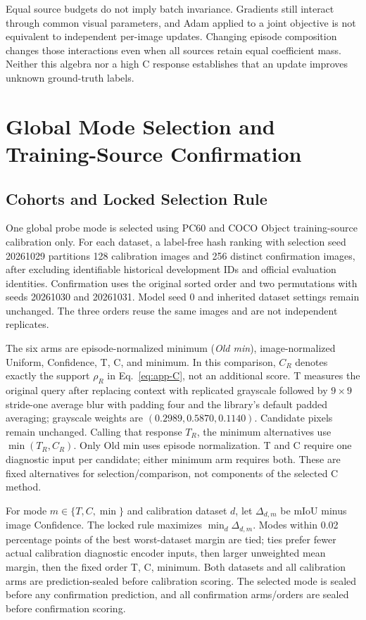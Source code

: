 Equal source budgets do not imply batch invariance. Gradients still interact through common visual parameters, and Adam applied to a joint objective is not equivalent to independent per-image updates. Changing episode composition changes those interactions even when all sources retain equal coefficient mass. Neither this algebra nor a high C response establishes that an update improves unknown ground-truth labels.

\section{Global Mode Selection and Training-Source Confirmation}
\label{app:selection}
\subsection{Cohorts and Locked Selection Rule}
One global probe mode is selected using PC60 and COCO Object training-source calibration only. For each dataset, a label-free hash ranking with selection seed 20261029 partitions 128 calibration images and 256 distinct confirmation images, after excluding identifiable historical development IDs and official evaluation identities. Confirmation uses the original sorted order and two permutations with seeds 20261030 and 20261031. Model seed 0 and inherited dataset settings remain unchanged. The three orders reuse the same images and are not independent replicates.

The six arms are episode-normalized minimum (\emph{Old min}), image-normalized Uniform, Confidence, T, C, and minimum. In this comparison, $C_R$ denotes exactly the support $\rho_R$ in Eq.~\ref{eq:app-C}, not an additional score. T measures the original query after replacing context with replicated grayscale followed by $9\times9$ stride-one average blur with padding four and the library's default padded averaging; grayscale weights are $(0.2989,0.5870,0.1140)$. Candidate pixels remain unchanged. Calling that response $T_R$, the minimum alternatives use $\min(T_R,C_R)$. Only Old min uses episode normalization. T and C require one diagnostic input per candidate; either minimum arm requires both. These are fixed alternatives for selection/comparison, not components of the selected C method.

For mode $m\in\{T,C,\min\}$ and calibration dataset $d$, let $\Delta_{d,m}$ be mIoU minus image Confidence. The locked rule maximizes $\min_d\Delta_{d,m}$. Modes within 0.02 percentage points of the best worst-dataset margin are tied; ties prefer fewer actual calibration diagnostic encoder inputs, then larger unweighted mean margin, then the fixed order T, C, minimum. Both datasets and all calibration arms are prediction-sealed before calibration scoring. The selected mode is sealed before any confirmation prediction, and all confirmation arms/orders are sealed before confirmation scoring.

